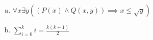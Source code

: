 \documentclass{article}
\begin{document}
\begin{enumerate}[(a)]
    \item $\forall x \exists y \left( \left( P(x) \land Q(x,y) \right)  \implies x \leq \sqrt{y}  \right) $
    \item $\displaystyle \sum_{i=0}^{k} i=\frac{k(k+1)}{2}$
\end{enumerate}
\end{document}
